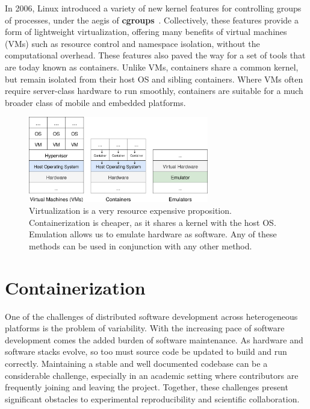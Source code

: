\documentclass[12pt,initial,twoside,maitrise]{dms}
\numberwithin{equation}{section}
\numberwithin{table}{chapter}
\numberwithin{figure}{chapter}
\begin{document}
In 2006, Linux introduced a variety of new kernel features for controlling groups of processes, under the aegis of \textbf{cgroups}~\citep{menage2007adding}. Collectively, these features provide a form of lightweight virtualization, offering many benefits of virtual machines (VMs) such as resource control and namespace isolation, without the computational overhead. These features also paved the way for a set of tools that are today known as containers. Unlike VMs, containers share a common kernel, but remain isolated from their host OS and sibling containers. Where VMs often require server-class hardware to run smoothly, containers are suitable for a much broader class of mobile and embedded platforms.

\begin{figure}
    \centering
    \includegraphics[width=0.70\textwidth]{vms_containers_emulators.png}
    \caption{Virtualization is a very resource expensive proposition. Containerization is cheaper, as it shares a kernel with the host OS. Emulation allows us to emulate hardware as software. Any of these methods can be used in conjunction with any other method.\vspace{-10}}
    \label{fig:vms_containers_emulators}
\end{figure}

\section{Containerization}\label{sec:containerization}

One of the challenges of distributed software development across heterogeneous platforms is the problem of variability. With the increasing pace of software development comes the added burden of software maintenance. As hardware and software stacks evolve, so too must source code be updated to build and run correctly. Maintaining a stable and well documented codebase can be a considerable challenge, especially in an academic setting where contributors are frequently joining and leaving the project. Together, these challenges present significant obstacles to experimental reproducibility and scientific collaboration.
\end{document}
